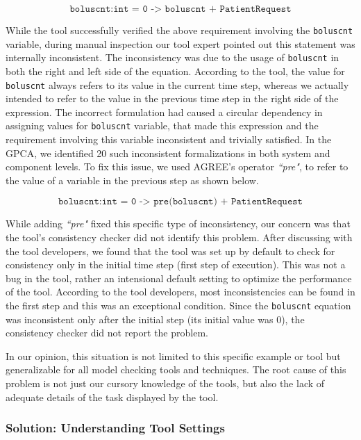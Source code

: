 $$ \texttt{boluscnt:int = 0 -> boluscnt + PatientRequest} $$

While the tool successfully verified the above requirement involving the \texttt{boluscnt} variable, during manual inspection our tool expert pointed out this statement was internally inconsistent. The inconsistency was due to the usage of \texttt{boluscnt} in both the right and left side of the equation. According to the tool, the value for \texttt{boluscnt} always refers to its value in the current time step, whereas we actually intended to refer to the value in the previous time step in the right side of the expression. The incorrect formulation had caused a circular dependency in assigning values for \texttt{boluscnt} variable, that made this expression and the requirement involving this variable inconsistent and trivially satisfied. In the GPCA, we identified 20 such inconsistent formalizations in both system and component levels. To fix this issue, we used AGREE's operator \emph{``pre"}, to refer to the value of a variable in the previous step as shown below.

$$ \texttt{boluscnt:int = 0 -> pre(boluscnt) + PatientRequest} $$

While adding \emph{``pre"} fixed this specific type of inconsistency, our concern was that the tool's consistency checker did not identify this problem. After discussing with the tool developers, we found that the tool was set up by default to check for consistency only in the initial time step (first step of execution). This was not a bug in the tool, rather an intensional default setting to optimize the performance of the tool. According to the tool developers, most inconsistencies can be found in the first step and this was an exceptional condition. Since the \texttt{boluscnt} equation was inconsistent only after the initial step (its initial value was 0), the consistency checker did not report the problem.

In our opinion, this situation is not limited to this specific example or tool but generalizable for all model checking tools and techniques. The root cause of this problem is not just our cursory knowledge of the tools, but also the lack of adequate details of the task displayed by the tool. 


\subsubsection {Solution: Understanding Tool Settings}

